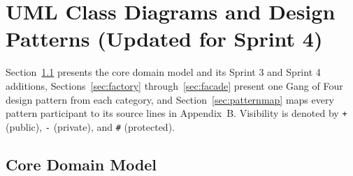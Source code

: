 \documentclass[12pt,letterpaper]{article}
\begin{document}
\section{UML Class Diagrams and Design Patterns (Updated for Sprint 4)}
Section~\ref{sec:domain} presents the core domain model and its Sprint 3 and Sprint 4
additions,
Sections~\ref{sec:factory} through~\ref{sec:facade} present one Gang of Four design
pattern from each category, and Section~\ref{sec:patternmap} maps every pattern
participant to its source lines in Appendix~B. Visibility is denoted by \texttt{+} (public), \texttt{-}
(private), and \texttt{\#} (protected).

\subsection{Core Domain Model}\label{sec:domain}
\end{document}
